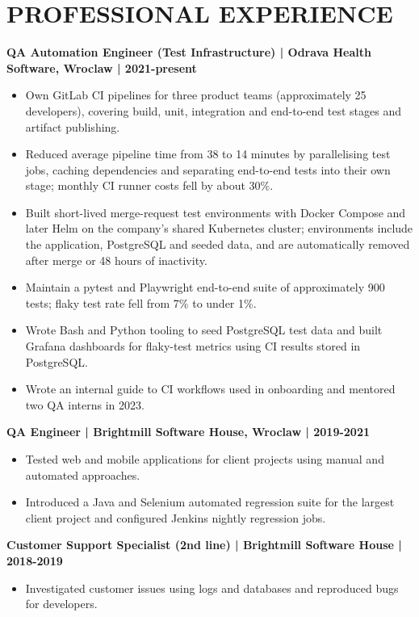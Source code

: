 \documentclass[11pt,a4paper]{article}
\begin{document}
\section*{PROFESSIONAL EXPERIENCE}
\textbf{QA Automation Engineer (Test Infrastructure) | Odrava Health Software, Wroclaw | 2021-present}
\begin{itemize}
\item Own GitLab CI pipelines for three product teams (approximately 25 developers), covering build, unit, integration and end-to-end test stages and artifact publishing.
\item Reduced average pipeline time from 38 to 14 minutes by parallelising test jobs, caching dependencies and separating end-to-end tests into their own stage; monthly CI runner costs fell by about 30\%.
\item Built short-lived merge-request test environments with Docker Compose and later Helm on the company's shared Kubernetes cluster; environments include the application, PostgreSQL and seeded data, and are automatically removed after merge or 48 hours of inactivity.
\item Maintain a pytest and Playwright end-to-end suite of approximately 900 tests; flaky test rate fell from 7\% to under 1\%.
\item Wrote Bash and Python tooling to seed PostgreSQL test data and built Grafana dashboards for flaky-test metrics using CI results stored in PostgreSQL.
\item Wrote an internal guide to CI workflows used in onboarding and mentored two QA interns in 2023.
\end{itemize}

\textbf{QA Engineer | Brightmill Software House, Wroclaw | 2019-2021}
\begin{itemize}
\item Tested web and mobile applications for client projects using manual and automated approaches.
\item Introduced a Java and Selenium automated regression suite for the largest client project and configured Jenkins nightly regression jobs.
\end{itemize}

\textbf{Customer Support Specialist (2nd line) | Brightmill Software House | 2018-2019}
\begin{itemize}
\item Investigated customer issues using logs and databases and reproduced bugs for developers.
\end{itemize}
\end{document}
